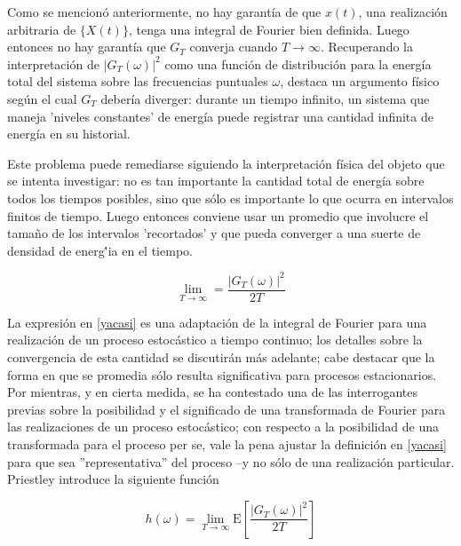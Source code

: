 \documentclass[12pt,a4paper]{mitthesis}
\newcommand{\E}[1]{\mathrm{E}\left[ #1 \right]}
\begin{document}
Como se mencion\'o anteriormente, no hay garant\'ia de que $x(t)$, una realizaci\'on arbitraria de
$\{X(t)\}$, tenga una integral de Fourier bien definida. Luego entonces no hay garant\'ia que 
$G_T$ converja cuando $T\rightarrow \infty$. Recuperando la interpretaci\'on de 
$\left| G_T(\omega) \right|^{2}$ como una funci\'on de distribuci\'on para la energ\'ia total del 
sistema sobre las frecuencias puntuales $\omega$, destaca un argumento f\'isico seg\'un el cual 
$G_T$ {deber\'ia} diverger: durante un tiempo infinito, un sistema que maneja 'niveles constantes' 
de energ\'ia puede registrar una cantidad infinita de energ\'ia en su historial. 

Este problema puede remediarse siguiendo la interpretaci\'on f\'isica del objeto que se intenta 
investigar: no es tan importante la cantidad total de energ\'ia sobre todos los tiempos posibles, 
sino que s\'olo es importante lo que ocurra en intervalos finitos de tiempo.
Luego entonces conviene usar un promedio que involucre el tama\~no de los intervalos 'recortados' 
y que pueda converger a una suerte de densidad de energ\''ia en el tiempo.

\begin{equation}
\lim_{T\rightarrow{\infty}} = \frac{ \left| G_T(\omega) \right|^{2}}{2 T}
\label{yacasi}
\end{equation}

La expresi\'on en \ref{yacasi} es una adaptaci\'on de la integral de Fourier para una realizaci\'on
de un proceso estoc\'astico a tiempo continuo; los detalles sobre la convergencia de esta 
cantidad se discutir\'an m\'as adelante; cabe destacar que la forma en que se promedia s\'olo 
resulta significativa para procesos estacionarios.
Por mientras, y en cierta medida, se ha contestado una de las interrogantes previas sobre la 
posibilidad y el significado de una transformada de Fourier para las realizaciones de un proceso 
estoc\'astico; con respecto a la posibilidad de una transformada para el proceso per se, vale la 
pena ajustar la definici\'on en \ref{yacasi} para que sea ''representativa'' del proceso --y no 
s\'olo de una realizaci\'on particular. Priestley introduce la siguiente funci\'on

\begin{equation}
h(\omega) = \lim_{T\rightarrow \infty} \E{ \frac{ \left| G_T(\omega) \right|^{2}}{2 T} }
\end{equation}
\end{document}
